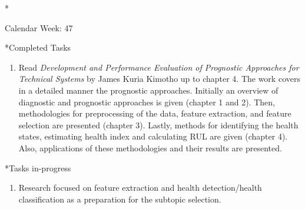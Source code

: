 \documentclass[11pt,a4paper]{article}
\begin{document}
\newpage
\begin{section}*{Calendar Week: 47 \hfill \date{20 November, 2020}}
 \begin{refsection}

       \begin{subsection}*{Completed Tasks}
             \begin{enumerate}
                   \item
                         Read \emph{Development and Performance Evaluation of Prognostic Approaches for Technical Systems} by James Kuria
                         Kimotho up to chapter 4. The work covers in a detailed manner the prognostic approaches. Initially an overview
                         of diagnostic and prognostic approaches is 	given (chapter 1 and 2). Then, methodologies for preprocessing
                         of the data, feature extraction, and feature selection are presented (chapter 3). Lastly, methods for identifying
                         the health states, estimating health index and calculating RUL are given (chapter 4). Also, applications
                         of these methodologies and their results are presented. \cite{jkkimothoprog}
             \end{enumerate}
       \end{subsection}


       \begin{subsection}*{Tasks in-progress}
             \begin{enumerate}
                   \item
                         Research focused on feature extraction and health detection/health classification as a preparation for
                         the subtopic selection.
             \end{enumerate}
       \end{subsection}

       \printbibliography
 \end{refsection}
\end{section}
\end{document}
